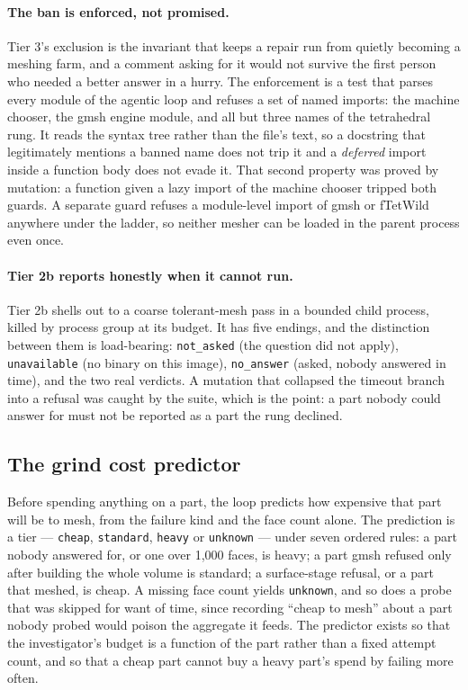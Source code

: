 \documentclass[11pt,onecolumn]{article}
\newcommand{\code}[1]{\texttt{\small #1}}
\begin{document}
\paragraph{The ban is enforced, not promised.}
Tier 3's exclusion is the invariant that keeps a repair
run from quietly becoming a meshing farm, and a comment asking for it would not survive the first
person who needed a better answer in a hurry. The enforcement is a test that parses every module of
the agentic loop and refuses a set of named imports: the machine chooser, the gmsh engine module,
and all but three names of the tetrahedral rung. It reads the syntax tree rather than the file's
text, so a docstring that legitimately mentions a banned name does not trip it and a \emph{deferred}
import inside a function body does not evade it. That second property was proved by mutation: a
function given a lazy import of the machine chooser tripped both guards. A separate guard refuses a
module-level import of gmsh or fTetWild anywhere under the ladder, so neither mesher can be loaded
in the parent process even once.

\paragraph{Tier 2b reports honestly when it cannot run.}
Tier 2b shells out to a coarse tolerant-mesh
pass in a bounded child process, killed by process group at its budget. It has five endings, and
the distinction between them is load-bearing: \code{not\_asked} (the question did not apply),
\code{unavailable} (no binary on this image), \code{no\_answer} (asked, nobody answered in time),
and the two real verdicts. A mutation that collapsed the timeout branch into a refusal was caught
by the suite, which is the point: a part nobody could answer for must not be reported as a part the
rung declined.

\subsection{The grind cost predictor}

Before spending anything on a part, the loop predicts how expensive that part will be to mesh, from
the failure kind and the face count alone. The prediction is a tier --- \code{cheap},
\code{standard}, \code{heavy} or \code{unknown} --- under seven ordered rules: a part nobody
answered for, or one over 1{,}000 faces, is heavy; a part gmsh refused only after building the
whole volume is standard; a surface-stage refusal, or a part that meshed, is cheap. A missing face
count yields \code{unknown}, and so does a probe that was skipped for want of time, since recording
``cheap to mesh'' about a part nobody probed would poison the aggregate it feeds. The predictor
exists so that the investigator's budget is a function of the part rather than a fixed attempt
count, and so that a cheap part cannot buy a heavy part's spend by failing more often.
\end{document}
